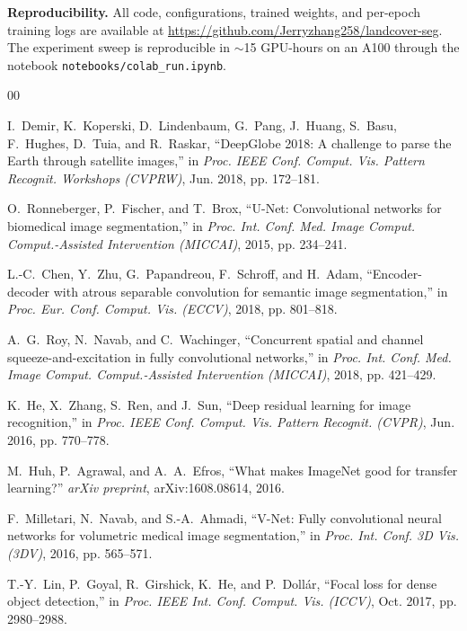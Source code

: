 \documentclass[conference,letterpaper,10pt]{IEEEtran}
\begin{document}
\textbf{Reproducibility.} All code, configurations, trained weights,
and per-epoch training logs are available at
\url{https://github.com/Jerryzhang258/landcover-seg}. The experiment
sweep is reproducible in $\sim$15 GPU-hours on an A100 through the
notebook \texttt{notebooks/colab\_run.ipynb}.

\begin{thebibliography}{00}

I.~Demir, K.~Koperski, D.~Lindenbaum, G.~Pang, J.~Huang, S.~Basu, F.~Hughes,
D.~Tuia, and R.~Raskar, ``DeepGlobe 2018: A challenge to parse the Earth
through satellite images,'' in \emph{Proc. IEEE Conf. Comput. Vis. Pattern
Recognit. Workshops (CVPRW)}, Jun. 2018, pp. 172--181.

O.~Ronneberger, P.~Fischer, and T.~Brox, ``U-Net: Convolutional networks
for biomedical image segmentation,'' in \emph{Proc. Int. Conf. Med. Image
Comput. Comput.-Assisted Intervention (MICCAI)}, 2015, pp. 234--241.

L.-C.~Chen, Y.~Zhu, G.~Papandreou, F.~Schroff, and H.~Adam, ``Encoder-decoder
with atrous separable convolution for semantic image segmentation,''
in \emph{Proc. Eur. Conf. Comput. Vis. (ECCV)}, 2018, pp. 801--818.

A.~G.~Roy, N.~Navab, and C.~Wachinger, ``Concurrent spatial and channel
squeeze-and-excitation in fully convolutional networks,'' in \emph{Proc.
Int. Conf. Med. Image Comput. Comput.-Assisted Intervention (MICCAI)},
2018, pp. 421--429.

K.~He, X.~Zhang, S.~Ren, and J.~Sun, ``Deep residual learning for image
recognition,'' in \emph{Proc. IEEE Conf. Comput. Vis. Pattern Recognit.
(CVPR)}, Jun. 2016, pp. 770--778.

M.~Huh, P.~Agrawal, and A.~A.~Efros, ``What makes ImageNet good for
transfer learning?'' \emph{arXiv preprint}, arXiv:1608.08614, 2016.

F.~Milletari, N.~Navab, and S.-A.~Ahmadi, ``V-Net: Fully convolutional
neural networks for volumetric medical image segmentation,'' in
\emph{Proc. Int. Conf. 3D Vis. (3DV)}, 2016, pp. 565--571.

T.-Y.~Lin, P.~Goyal, R.~Girshick, K.~He, and P.~Doll\'ar, ``Focal loss
for dense object detection,'' in \emph{Proc. IEEE Int. Conf. Comput. Vis.
(ICCV)}, Oct. 2017, pp. 2980--2988.


\end{thebibliography}
\end{document}

